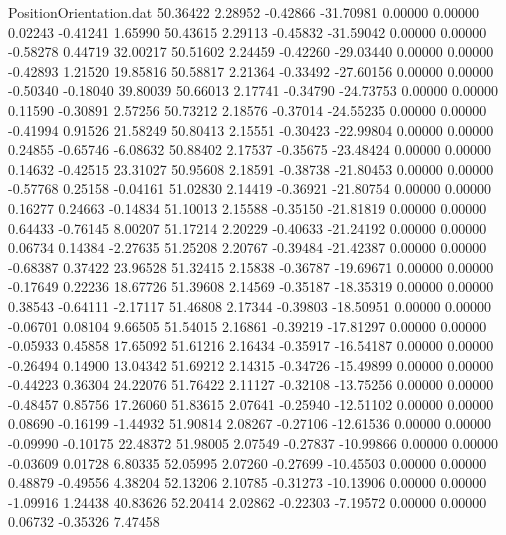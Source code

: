 \begin{filecontents}{PositionOrientation.dat}
  50.36422    2.28952   -0.42866   -31.70981    0.00000    0.00000    0.02243   -0.41241    1.65990
  50.43615    2.29113   -0.45832   -31.59042    0.00000    0.00000   -0.58278    0.44719   32.00217
  50.51602    2.24459   -0.42260   -29.03440    0.00000    0.00000   -0.42893    1.21520   19.85816
  50.58817    2.21364   -0.33492   -27.60156    0.00000    0.00000   -0.50340   -0.18040   39.80039
  50.66013    2.17741   -0.34790   -24.73753    0.00000    0.00000    0.11590   -0.30891    2.57256
  50.73212    2.18576   -0.37014   -24.55235    0.00000    0.00000   -0.41994    0.91526   21.58249
  50.80413    2.15551   -0.30423   -22.99804    0.00000    0.00000    0.24855   -0.65746   -6.08632
  50.88402    2.17537   -0.35675   -23.48424    0.00000    0.00000    0.14632   -0.42515   23.31027
  50.95608    2.18591   -0.38738   -21.80453    0.00000    0.00000   -0.57768    0.25158   -0.04161
  51.02830    2.14419   -0.36921   -21.80754    0.00000    0.00000    0.16277    0.24663   -0.14834
  51.10013    2.15588   -0.35150   -21.81819    0.00000    0.00000    0.64433   -0.76145    8.00207
  51.17214    2.20229   -0.40633   -21.24192    0.00000    0.00000    0.06734    0.14384   -2.27635
  51.25208    2.20767   -0.39484   -21.42387    0.00000    0.00000   -0.68387    0.37422   23.96528
  51.32415    2.15838   -0.36787   -19.69671    0.00000    0.00000   -0.17649    0.22236   18.67726
  51.39608    2.14569   -0.35187   -18.35319    0.00000    0.00000    0.38543   -0.64111   -2.17117
  51.46808    2.17344   -0.39803   -18.50951    0.00000    0.00000   -0.06701    0.08104    9.66505
  51.54015    2.16861   -0.39219   -17.81297    0.00000    0.00000   -0.05933    0.45858   17.65092
  51.61216    2.16434   -0.35917   -16.54187    0.00000    0.00000   -0.26494    0.14900   13.04342
  51.69212    2.14315   -0.34726   -15.49899    0.00000    0.00000   -0.44223    0.36304   24.22076
  51.76422    2.11127   -0.32108   -13.75256    0.00000    0.00000   -0.48457    0.85756   17.26060
  51.83615    2.07641   -0.25940   -12.51102    0.00000    0.00000    0.08690   -0.16199   -1.44932
  51.90814    2.08267   -0.27106   -12.61536    0.00000    0.00000   -0.09990   -0.10175   22.48372
  51.98005    2.07549   -0.27837   -10.99866    0.00000    0.00000   -0.03609    0.01728    6.80335
  52.05995    2.07260   -0.27699   -10.45503    0.00000    0.00000    0.48879   -0.49556    4.38204
  52.13206    2.10785   -0.31273   -10.13906    0.00000    0.00000   -1.09916    1.24438   40.83626
  52.20414    2.02862   -0.22303    -7.19572    0.00000    0.00000    0.06732   -0.35326    7.47458

\end{filecontents}
